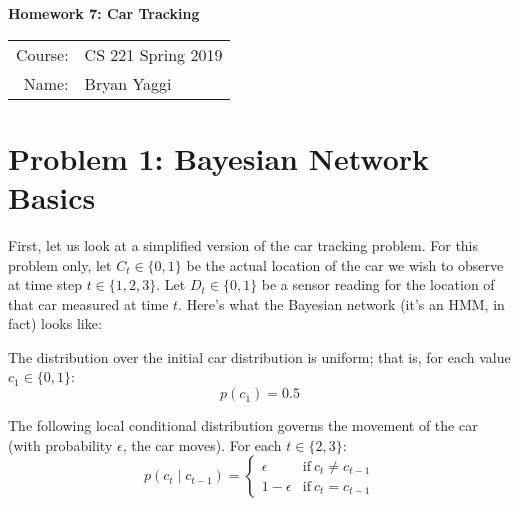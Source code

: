 \documentclass[10pt]{article}
\begin{document}
\begin{center}
{\Large \textbf{Homework 7: Car Tracking}}

\begin{tabular}{rl}
\\
Course: & CS 221 Spring 2019 \\
Name: & Bryan Yaggi
\end{tabular}
\end{center}

\section*{\normalsize Problem 1: Bayesian Network Basics}

First, let us look at a simplified version of the car tracking problem. For this problem only, let $C_t \in \{0,1\}$ be the actual location of the car we wish to observe at time step $t \in \{1,2,3\}$. Let $D_t \in \{0,1\}$ be a sensor reading for the location of that car measured at time $t$. Here's what the Bayesian network (it's an HMM, in fact) looks like:

\begin{center}
\end{center}

The distribution over the initial car distribution is uniform; that is, for each value $c_1 \in \{0,1\}$:
$$p(c_1) = 0.5$$

The following local conditional distribution governs the movement of the car (with probability $\epsilon$, the car moves). For each $t \in \{2,3\}$:
$$p(c_t \mid c_{t-1}) = \begin{cases}
	\epsilon &\text{if} \ c_t \neq c_{t-1}\\
	1 - \epsilon &\text{if} \ c_t = c_{t-1}
\end{cases}$$
\end{document}
